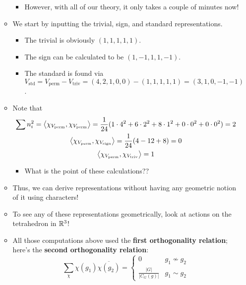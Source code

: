 \documentclass[../notes.tex]{subfiles}
\begin{document}
\begin{itemize}
\begin{itemize}
        \begin{itemize}
            \item However, with all of our theory, it only takes a couple of minutes now!
        \end{itemize}
        \item We start by inputting the trivial, sign, and standard representations.
        \begin{itemize}
            \item The trivial is obviously $(1,1,1,1,1)$.
            \item The sign can be calculated to be $(1,-1,1,1,-1)$.
            \item The standard is found via $V_\text{std}=V_\text{perm}-V_\text{triv}=(4,2,1,0,0)-(1,1,1,1,1)=(3,1,0,-1,-1)$.
        \end{itemize}
        \item Note that
        \begin{gather*}
            \sum n_i^2 = \left\langle{\chi_{V_\text{perm}},\chi_{V_\text{perm}}}\right\rangle
                = \frac{1}{24}(1\cdot 4^2+6\cdot 2^2+8\cdot 1^2+0\cdot 0^2+0\cdot 0^2)
                = 2\\
            \left\langle{\chi_{V_\text{perm}},\chi_{V_\text{sign}}}\right\rangle = \frac{1}{24}(4-12+8)
                = 0\\
            \left\langle{\chi_{V_\text{perm}},\chi_{V_\text{triv}}}\right\rangle = 1
        \end{gather*}
        \begin{itemize}
            \item What is the point of these calculations??
        \end{itemize}
        \item Thus, we can derive representations without having any geometric notion of it using characters!
        \item To see any of these representations geometrically, look at actions on the tetrahedron in $\mathbb{R}^3$!
        \item All those computations above used the \textbf{first orthogonality relation}; here's the \textbf{second orthogonality relation}:
        \begin{equation*}
            \sum_\chi\chi(g_1)\overline{\chi(g_2)} =
            \begin{cases}
                0 & g_1\nsim g_2\\
                \frac{|G|}{|C_G(g)|} & g_1\sim g_2
            \end{cases}
        \end{equation*}

\end{itemize}
\end{itemize}
\end{document}
